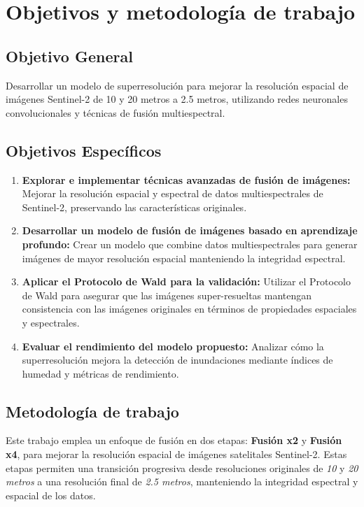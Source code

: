 \chapter{Objetivos y metodología de trabajo}

\section{Objetivo General}

    Desarrollar un modelo de superresolución para mejorar la resolución espacial de imágenes Sentinel-2 de 10 y 20 metros a 2.5 metros, utilizando redes neuronales convolucionales y técnicas de fusión multiespectral.


\section{Objetivos Específicos}

\begin{enumerate}
    \item \textbf{Explorar e implementar técnicas avanzadas de fusión de imágenes:} Mejorar la resolución espacial y espectral de datos multiespectrales de Sentinel-2, preservando las características originales.
    \item \textbf{Desarrollar un modelo de fusión de imágenes basado en aprendizaje profundo:} Crear un modelo que combine datos multiespectrales para generar imágenes de mayor resolución espacial manteniendo la integridad espectral.
    \item \textbf{Aplicar el Protocolo de Wald para la validación:} Utilizar el Protocolo de Wald para asegurar que las imágenes super-resueltas mantengan consistencia con las imágenes originales en términos de propiedades espaciales y espectrales.
    \item \textbf{Evaluar el rendimiento del modelo propuesto:} Analizar cómo la superresolución mejora la detección de inundaciones mediante índices de humedad y métricas de rendimiento.
\end{enumerate}

\section{Metodología de trabajo}

    Este trabajo emplea un enfoque de fusión en dos etapas: \textbf{Fusión x2} y \textbf{Fusión x4}, para mejorar la resolución espacial de imágenes satelitales Sentinel-2. Estas etapas permiten una transición progresiva desde resoluciones originales de \textit{10} y \textit{20 metros} a una resolución final de \textit{2.5 metros}, manteniendo la integridad espectral y espacial de los datos.

